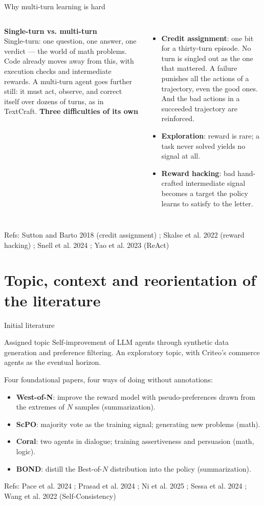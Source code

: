 \documentclass[aspectratio=169,10pt]{beamer}
\newcommand{\refs}[1]{\vfill{\tiny\textcolor{crMid}{Refs: #1}}}
\newcommand{\hl}[1]{\textcolor{crOrange}{\textbf{#1}}}
\begin{document}
\begin{frame}{Why multi-turn learning is hard}
\begin{columns}[T]
\textbf{Single-turn vs. multi-turn}\\[0.15cm]
\small Single-turn: one question, one answer, one verdict — the world of math problems. Code already moves away from this, with execution checks and intermediate rewards. A multi-turn agent goes further still: it must act, observe, and correct itself over dozens of turns, as in TextCraft.
\textbf{Three difficulties of its own}
\begin{itemize}
  \item \hl{Credit assignment}: one bit for a thirty-turn episode. No turn is singled out as the one that mattered. A failure punishes all the actions of a trajectory, even the good ones. And the bad actions in a succeeded trajectory are reinforced.
  \item \hl{Exploration}: reward is rare; a task never solved yields no signal at all.
  \item \hl{Reward hacking}: bad hand-crafted intermediate signal becomes a target the policy learns to satisfy to the letter.
\end{itemize}
\end{columns}
\refs{Sutton and Barto 2018 (credit assignment) ; Skalse et al. 2022 (reward hacking) ; Snell et al. 2024 ; Yao et al. 2023 (ReAct)}
\end{frame}

\section{Topic, context and reorientation of the literature}

\begin{frame}{Initial literature}
\begin{block}{Assigned topic}
Self-improvement of LLM agents through synthetic data generation and preference filtering. An exploratory topic, with Criteo's commerce agents as the eventual horizon.
\end{block}
\vspace{0.2cm}
Four foundational papers, four ways of doing without annotations:
\begin{itemize}
  \item \textbf{West-of-N}: improve the reward model with pseudo-preferences drawn from the extremes of $N$ samples (summarization).
  \item \textbf{ScPO}: majority vote as the training signal; generating new problems (math).
  \item \textbf{Coral}: two agents in dialogue; training assertiveness and persuasion (math, logic).
  \item \textbf{BOND}: distill the Best-of-$N$ distribution into the policy (summarization).
\end{itemize}
\vspace{0.2cm}
\refs{Pace et al. 2024 ; Prasad et al. 2024 ; Ni et al. 2025 ; Sessa et al. 2024 ; Wang et al. 2022 (Self-Consistency)}
\end{frame}
\end{document}
